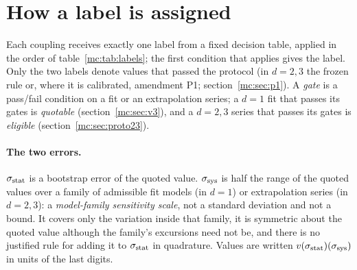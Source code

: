 \section{How a label is assigned}\label{mc:sec:labels}
Each coupling receives exactly one label from a fixed decision table, applied in the order of table~\ref{mc:tab:labels}; the first condition that
applies gives the label. Only the two  labels denote values that passed the protocol (in $d=2,3$ the frozen rule or, where it
is calibrated, amendment P1; section~\ref{mc:sec:p1}). A \emph{gate} is a pass/fail condition on a fit or an extrapolation series; a $d=1$ fit that
passes its gates is \emph{quotable} (section~\ref{mc:sec:v3}), and a $d=2,3$ series that passes its gates is \emph{eligible}
(section~\ref{mc:sec:proto23}).

\paragraph{The two errors.} $\sigma_{\rm stat}$ is a bootstrap error of the quoted value. $\sigma_{\rm sys}$ is half the range of the quoted values over a family of
admissible fit models (in $d=1$) or extrapolation series (in $d=2,3$): a \emph{model-family sensitivity scale}, not a standard deviation and
not a bound. It covers only the variation inside that family, it is symmetric about the quoted value although the family's excursions need not
be, and there is no justified rule for adding it to $\sigma_{\rm stat}$ in quadrature. Values are written $v(\sigma_{\rm stat})(\sigma_{\rm sys})$ in units of the last digits.

